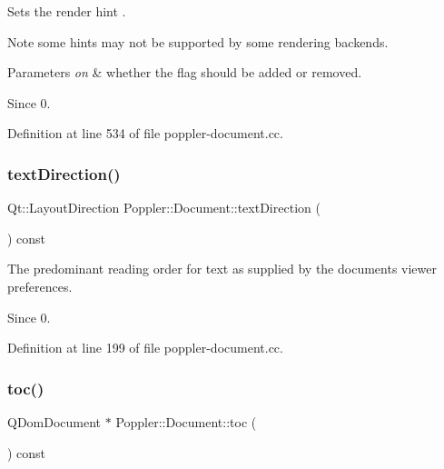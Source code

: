Sets the render {\ttfamily hint} .

\begin{DoxyNote}{Note}
some hints may not be supported by some rendering backends.
\end{DoxyNote}

\begin{DoxyParams}{Parameters}
{\em on} & whether the flag should be added or removed.\\
\hline
\end{DoxyParams}
\begin{DoxySince}{Since}
0. 
\end{DoxySince}


Definition at line 534 of file poppler-\/document.\+cc.

\mbox{\label{class_poppler_1_1_document_a854e191808926d0bcf277a97243f5737}} 
\subsubsection{\texorpdfstring{text\+Direction()}{textDirection()}}
{\footnotesize\ttfamily Qt\+::\+Layout\+Direction Poppler\+::\+Document\+::text\+Direction (\begin{DoxyParamCaption}{ }\end{DoxyParamCaption}) const}

The predominant reading order for text as supplied by the document\textquotesingle{}s viewer preferences.

\begin{DoxySince}{Since}
0. 
\end{DoxySince}


Definition at line 199 of file poppler-\/document.\+cc.

\mbox{\label{class_poppler_1_1_document_a3b622bb1d5a5c7f24a9baf8efc5d7b1f}} 
\subsubsection{\texorpdfstring{toc()}{toc()}}
{\footnotesize\ttfamily Q\+Dom\+Document $\ast$ Poppler\+::\+Document\+::toc (\begin{DoxyParamCaption}{ }\end{DoxyParamCaption}) const}


